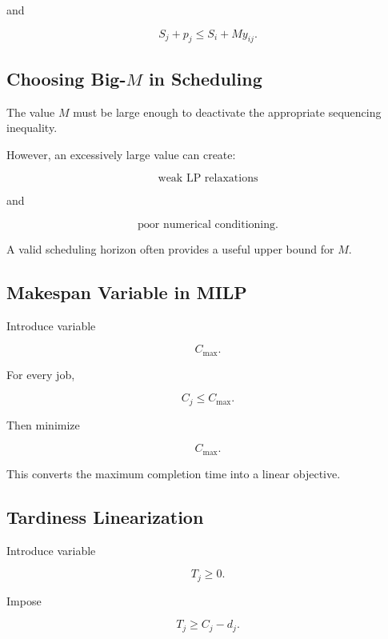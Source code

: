 and

\[
\boxed{
S_j+p_j
\leq
S_i
+
My_{ij}.
}
\]

\subsection{Choosing Big-\(M\) in Scheduling}
\label{subsec:scheduling-big-m}

The value \(M\) must be large enough to deactivate the appropriate
sequencing inequality.

However, an excessively large value can create:

\[
\boxed{
\text{weak LP relaxations}
}
\]

and

\[
\boxed{
\text{poor numerical conditioning}.
}
\]

A valid scheduling horizon often provides a useful upper bound for \(M\).

\subsection{Makespan Variable in MILP}
\label{subsec:makespan-variable-milp}

Introduce variable

\[
C_{\max}.
\]

For every job,

\[
\boxed{
C_j
\leq
C_{\max}.
}
\]

Then minimize

\[
\boxed{
C_{\max}.
}
\]

This converts the maximum completion time into a linear objective.

\subsection{Tardiness Linearization}
\label{subsec:tardiness-linearization}

Introduce variable

\[
T_j\geq0.
\]

Impose

\[
\boxed{
T_j
\geq
C_j-d_j.
}
\]

